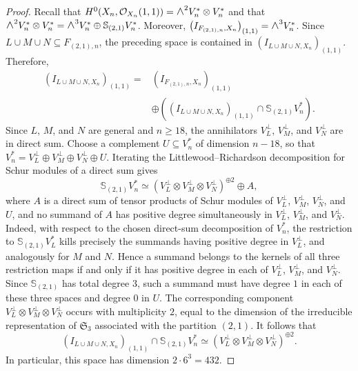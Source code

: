 \documentclass[a4paper,reqno]{amsart}
\theoremstyle{plainnopunct}
\theoremstyle{definitionnopunct}
\newcommand{\superwedge}{\mathlarger{\mathlarger{\wedge}}}
\renewcommand{\S}{\mathbb{S}}
\newcommand{\cO}{\mathcal{O}}
\begin{document}
\begin{proof}
Recall that
$H^0(X_n,\cO_{X_n}(1,1))
=\superwedge^2V_n^*\otimes V_n^*$
and that
$
\superwedge^2V_n^*\otimes V_n^*
=
\superwedge^3V_n^*
\oplus
\S_{(2,1)}V_n^*$.
Moreover,
$
\left(
I_{F_{(2,1),n},X_n}
\right)_{(1,1)}
=
\superwedge^3V_n^*$. Since $L\cup M\cup N\subseteq F_{(2,1),n}$, the preceding space is
contained in
$\left(I_{L\cup M\cup N,X_n}\right)_{(1,1)}$. Therefore,
\[
\begin{aligned}
\left(
I_{L\cup M\cup N,X_n}
\right)_{(1,1)}
={}&
\left(
I_{F_{(2,1),n},X_n}
\right)_{(1,1)}
\\
&\oplus
\left(
\left(
I_{L\cup M\cup N,X_n}
\right)_{(1,1)}
\cap
\S_{(2,1)}V_n^*
\right).
\end{aligned}
\]
Since $L$, $M$, and $N$ are general and $n\geq18$, the annihilators
$V_L^\perp$, $V_M^\perp$, and $V_N^\perp$ are in direct sum. Choose a
complement $U\subseteq V_n^*$ of dimension $n-18$, so that
$V_n^*=V_L^\perp\oplus V_M^\perp\oplus V_N^\perp\oplus U$. Iterating the Littlewood--Richardson decomposition for Schur modules
of a direct sum gives
\[
\S_{(2,1)}V_n^*
\simeq
\left(
V_L^\perp
\otimes
V_M^\perp
\otimes
V_N^\perp
\right)^{\oplus2}
\oplus A,
\]
where $A$ is a direct sum of tensor products of Schur modules of
$V_L^\perp$, $V_M^\perp$, $V_N^\perp$, and $U$, and no summand of
$A$ has positive degree simultaneously in
$V_L^\perp$, $V_M^\perp$, and $V_N^\perp$. Indeed, with respect to the chosen direct-sum decomposition of
$V_n^*$, the restriction to $\S_{(2,1)}V_L^*$ kills precisely the
summands having positive degree in $V_L^\perp$, and analogously for
$M$ and $N$. Hence a summand belongs to the kernels of all three
restriction maps if and only if it has positive degree in each of
$V_L^\perp$, $V_M^\perp$, and $V_N^\perp$. Since
$\S_{(2,1)}$ has total degree $3$, such a summand must have degree
$1$ in each of these three spaces and degree $0$ in $U$. The
corresponding component $V_L^\perp\otimes V_M^\perp\otimes V_N^\perp$ occurs with multiplicity $2$, equal
to the dimension of the irreducible representation of
$\mathfrak S_3$ associated with the partition $(2,1)$. It follows that
\[
\left(
I_{L\cup M\cup N,X_n}
\right)_{(1,1)}
\cap
\S_{(2,1)}V_n^*
\simeq
\left(
V_L^\perp
\otimes
V_M^\perp
\otimes
V_N^\perp
\right)^{\oplus2}.
\]
In particular, this space has dimension $2\cdot6^3=432$.


\end{proof}
\end{document}
